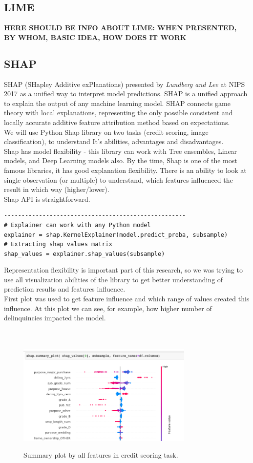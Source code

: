 \subsection{LIME}
\textbf{HERE SHOULD BE INFO ABOUT LIME: WHEN PRESENTED, BY WHOM, BASIC IDEA, HOW DOES IT WORK}

\subsection{SHAP}
SHAP (SHapley Additive exPlanations) presented by \textit{Lundberg and Lee} \cite{SHAP} at NIPS 2017 as a unified way to interpret model predictions. 
SHAP is a unified approach to explain the output of any machine learning model. SHAP connects game theory with local explanations, representing the only possible consistent and locally accurate additive feature attribution method based on expectations. \\
We will use Python Shap library on two tasks (credit scoring, image classification), to understand It's abilities, advantages and disadvantages.\\
Shap has model flexibility - this library can work with Tree ensembles, Linear models, and Deep Learning models also. By the time, Shap is one of the most famous libraries, it has good explanation flexibility. There is an ability to look at single observation (or multiple) to understand, which features influenced the result in which way (higher/lower). \\
Shap API is straightforward. \\
\begin{lstlisting}
----------------------------------------------------
# Explainer can work with any Python model
explainer = shap.KernelExplainer(model.predict_proba, subsample)
# Extracting shap values matrix
shap_values = explainer.shap_values(subsample)
\end{lstlisting}
Representation flexibility is important part of this research, so we was trying to use all visualization abilities of the library to get better understanding of prediction results and features influence.\\
First plot was used to get feature influence and which range of values created this influence. At this plot we can see, for example,  how higher number of delinquincies impacted the model.\\
\\
\\

\begin{figure}[!htb]
\centering
\includegraphics[height=5cm]{shap_ex1.png}\\[0.5cm] 
\caption{Summary plot by all features in credit scoring task. }
\end{figure}

